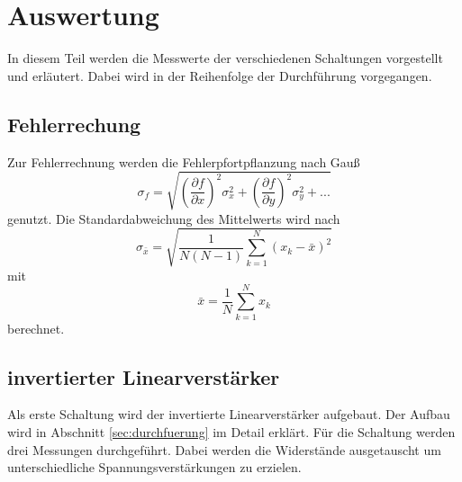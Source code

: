 \section{Auswertung}
\label{sec:auswertung}
In diesem Teil werden die Messwerte der verschiedenen Schaltungen vorgestellt und erläutert.
Dabei wird in der Reihenfolge der Durchführung vorgegangen.
\subsection{Fehlerrechung}
Zur Fehlerrechnung werden die Fehlerpfortpflanzung nach Gauß
\begin{equation}
    \sigma_f = \sqrt{\left(\frac{\partial f}{\partial x}\right)^2 \sigma_x ^2 + \left( \frac{\partial f}{\partial y}\right)^2 \sigma_y ^2 + ...}
\end{equation}
genutzt.
Die Standardabweichung des Mittelwerts wird nach
\begin{equation}
    \sigma_{\bar{x}} = \sqrt{\frac{1}{N(N-1)} \sum_{k=1}^N (x_k - \bar{x})^2}
\end{equation}
mit 
\begin{equation}
    \bar{x} = \frac{1}{N} \sum_{k=1} ^N x_k
\end{equation}
berechnet.
\subsection{invertierter Linearverstärker}
Als erste Schaltung wird der invertierte Linearverstärker aufgebaut.
Der Aufbau wird in Abschnitt \ref{sec:durchfuerung} im Detail erklärt.
Für die Schaltung werden drei Messungen durchgeführt.
Dabei werden die Widerstände ausgetauscht um unterschiedliche Spannungsverstärkungen zu erzielen.

